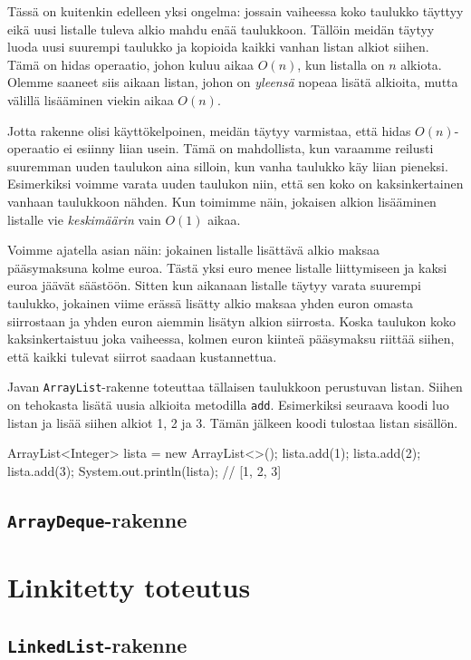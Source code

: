 Tässä on kuitenkin edelleen yksi ongelma: jossain vaiheessa koko taulukko
täyttyy eikä uusi listalle tuleva alkio mahdu enää taulukkoon.
Tällöin meidän täytyy luoda uusi suurempi taulukko ja
kopioida kaikki vanhan listan alkiot siihen.
Tämä on hidas operaatio, johon kuluu aikaa $O(n)$,
kun listalla on $n$ alkiota.
Olemme saaneet siis aikaan listan, johon on \emph{yleensä} nopeaa lisätä
alkioita, mutta välillä lisääminen viekin aikaa $O(n)$.

Jotta rakenne olisi käyttökelpoinen, meidän täytyy varmistaa,
että hidas $O(n)$-operaatio ei esiinny liian usein.
Tämä on mahdollista, kun varaamme reilusti suuremman uuden taulukon
aina silloin, kun vanha taulukko käy liian pieneksi.
Esimerkiksi voimme varata uuden taulukon niin,
että sen koko on kaksinkertainen vanhaan taulukkoon nähden.
Kun toimimme näin, jokaisen alkion lisääminen listalle vie
\emph{keskimäärin} vain $O(1)$ aikaa.

Voimme ajatella asian näin: jokainen listalle lisättävä alkio
maksaa pääsy\-maksuna kolme euroa.
Tästä yksi euro menee listalle liittymiseen ja kaksi euroa jäävät säästöön.
Sitten kun aikanaan listalle täytyy varata suurempi taulukko,
jokainen viime erässä lisätty alkio maksaa yhden euron omasta siirrostaan
ja yhden euron aiemmin lisätyn alkion siirrosta.
Koska taulukon koko kaksinkertaistuu joka vaiheessa,
kolmen euron kiinteä pääsymaksu riittää siihen, että kaikki tulevat
siirrot saadaan kustannettua.

Javan \texttt{ArrayList}-rakenne toteuttaa tällaisen taulukkoon
perustuvan listan.
Siihen on tehokasta lisätä uusia alkioita metodilla \texttt{add}.
Esimerkiksi seuraava koodi luo listan ja lisää siihen alkiot
1, 2 ja 3. Tämän jälkeen koodi tulostaa listan sisällön.

\begin{code}
ArrayList<Integer> lista = new ArrayList<>();
lista.add(1);
lista.add(2);
lista.add(3);
System.out.println(lista); // [1, 2, 3]
\end{code}

\subsection{\texttt{ArrayDeque}-rakenne}

\section{Linkitetty toteutus}

\subsection{\texttt{LinkedList}-rakenne}
